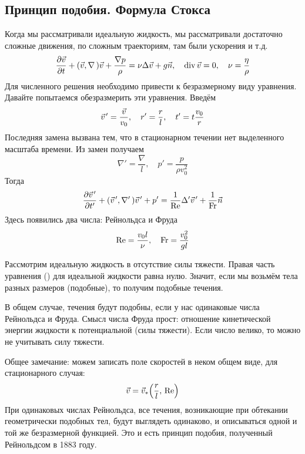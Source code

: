 \subsection{Принцип подобия. Формула Стокса}
Когда мы рассматривали идеальную жидкость, мы рассматривали достаточно сложные движения, по сложным траекториям, там были ускорения и т.д.
\begin{equation}
    \pdv{\vec{v}}{t}+(\vec{v},\nabla\,)\vec{v}+\frac{\nabla p}{\rho}=
    \nu \Delta \vec{v} + g \vec{n}, \quad
    \operatorname{div} \vec{v} = 0, \quad \nu=\frac{\eta}{\rho}
\end{equation}
Для численного решения необходимо привести к безразмерному виду уравнения. Давайте попытаемся обезразмерить эти уравнения. Введём
\begin{equation}
    \pvec{v}' = \frac{\vec{v}}{v_0}, \quad
    r' = \frac{r}{l}, \quad
    t' = t \frac{v_0}{r}
\end{equation}
Последняя замена вызвана тем, что в стационарном течении нет выделенного масштаба времени.
Из замен получаем
\begin{equation}
    \nabla' = \frac{\nabla}{l},\quad
    p'=\frac{p}{\rho v_0^2}
\end{equation}
Тогда
\begin{equation}
    \pdv{\pvec{v}'}{t'}+(\pvec{v}', \nabla'\,)\pvec{v}' + p'=
    \frac{1}{\Re}\Delta' \pvec{v}' + \frac{1}{\Fr} \vec{n}
\end{equation}
Здесь появились два числа: Рейнольдса и Фруда
\begin{equation}
    \Re=\frac{v_0 l}{\nu}, \quad
    \operatorname{Fr}=\frac{v_0^2}{gl}
\end{equation}

Рассмотрим идеальную жидкость в отсутствие силы тяжести. Правая часть уравнения () для идеальной жидкости равна нулю. Значит, если мы возьмём тела разных размеров (подобные), то получим подобные течения.

В общем случае, течения будут подобны, если у нас одинаковые числа
Рейнольдса и Фруда. Смысл числа Фруда прост: отношение кинетической энергии жидкости к потенциальной (силы тяжести). Если число велико, то можно не учитывать силу тяжести.

Общее замечание: можем записать поле скоростей в неком общем виде, для стационарного случая:
\begin{equation}
    \vec{v}=\vec{v}_* \qty(\frac{r}{l},\, \Re)
\end{equation}
При одинаковых числах Рейнольдса, все течения, возникающие при обтекании геометрически подобных тел, будут выглядеть одинаково, и описываться одной и той же безразмерной функцией. Это и есть принцип подобия, полученный Рейнольдсом в 1883 году.

